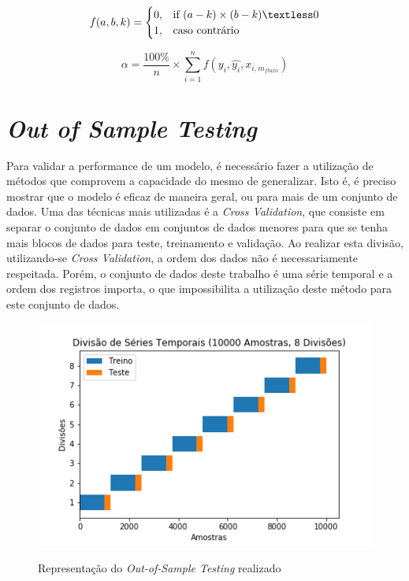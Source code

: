 \begin{equation}
f(a, b, k) =
\begin{cases}
  0, & \text{if}\ (a - k) \times (b - k) \textless 0 \\
  1, & \text{caso contrário}
\end{cases}
\end{equation}

\begin{equation}
\alpha = \frac{100\%}{n} \times \sum_{i=1}^{n} f(y_i, \hat{y_i}, x_{i, m_{fluxo}})
\end{equation}

\section{\textit{Out of Sample Testing}}

Para validar a performance de um modelo, é necessário fazer a utilização de métodos que comprovem a capacidade do mesmo de generalizar. Isto é, é preciso mostrar que o modelo é eficaz de maneira geral, ou para mais de um conjunto de dados. Uma das técnicas mais utilizadas é a \textit{Cross Validation}, que consiste em separar o conjunto de dados em conjuntos de dados menores para que se tenha mais blocos de dados para teste, treinamento e validação. Ao realizar esta divisão, utilizando-se \textit{Cross Validation}, a ordem dos dados não é necessariamente respeitada. Porém, o conjunto de dados deste trabalho é uma série temporal e a ordem dos registros importa, o que impossibilita a utilização deste método para este conjunto de dados. 

\begin{figure}[htbp]
    \centering
    \includegraphics[scale=0.9]{monography/img/methods/blocking_cv.png}
    \label{figure:blocking}
    \caption[Representação do \textit{Out-of-Sample Testing} realizado]{Representação do \textit{Out-of-Sample Testing} realizado}
\end{figure}

